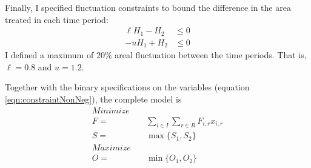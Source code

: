 Finally, I specified fluctuation constraints to bound the difference in the area treated in each time period:
\begin{align}
\ell H_1 - H_2 &\le 0 \\
-u H_1 + H_2 &\le 0
\end{align}
I defined a maximum of 20\% areal fluctuation between the time periods. That is, $\ell = 0.8$ and $u = 1.2$.

Together with the binary specifications on the variables (equation \eqref{eqn:constraintNonNeg}), the complete model is
\begin{align*}
Minimize \quad & \\
F=&\sum_{i\in I}\sum_{r\in R} F_{i,r} x_{i,r}\\
S=&\max \{S_1,S_2\}\\
Maximize \quad & \\
O =&\min \{O_1,O_2\}
\end{align*}

